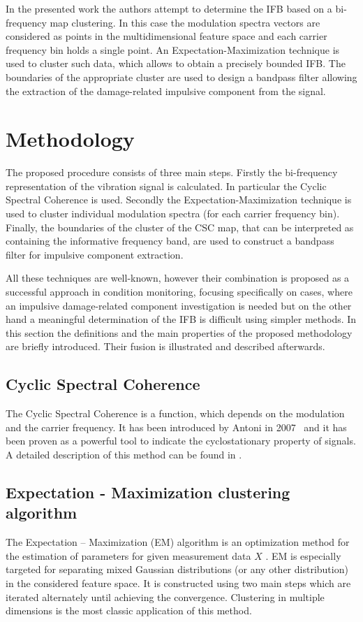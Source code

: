 \documentclass[10pt]{article}
\begin{document}
In the presented work the authors attempt to determine the IFB based on a bi-frequency map clustering. In this case the modulation spectra vectors are considered as points in the multidimensional feature space and each carrier frequency bin holds a single point. An Expectation-Maximization technique is used to cluster such data, which allows to obtain a precisely bounded IFB. The boundaries of the appropriate cluster are used to design a bandpass filter allowing the extraction of the damage-related impulsive component from the signal.

\section{Methodology}

The proposed procedure consists of three main steps. Firstly the bi-frequency representation of the vibration signal is calculated. In particular the Cyclic Spectral Coherence is used. Secondly the Expectation-Maximization technique is used to cluster individual modulation spectra (for each carrier frequency bin). Finally, the boundaries of the cluster of the CSC map, that can be interpreted as containing the informative frequency band, are used to construct a bandpass filter for impulsive component extraction.

All these techniques are well-known, however their combination is proposed as a successful approach in condition monitoring, focusing specifically on cases, where an impulsive damage-related component investigation is needed but on the other hand a meaningful determination of the IFB is difficult using simpler methods. In this section the definitions and the main properties of the proposed methodology are briefly introduced. Their fusion is illustrated and described afterwards. 

\subsection{Cyclic Spectral Coherence}
The Cyclic Spectral Coherence is a function, which depends on the modulation and the carrier frequency. It has been introduced by Antoni in 2007~\cite{antoni2007cyclic} and it has been proven as a powerful tool to indicate the cyclostationary property of signals. A detailed description of this method can be found in \cite{wodecki2017automatic}.

\subsection{Expectation - Maximization clustering algorithm}
The Expectation -- Maximization (EM) algorithm is an optimization method for the estimation of parameters for given measurement data $X$ \cite{sundberg1974maximum,dempster1977maximum}. EM is especially targeted for separating mixed Gaussian distributions (or any other distribution) in the considered feature space. It is constructed using two main steps which are iterated alternately until achieving the convergence. Clustering in multiple dimensions is the most classic application of this method.
\end{document}

